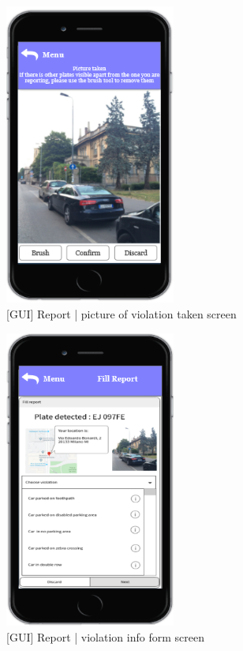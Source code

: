 \begin{figure}[H]
		\centering
      \includegraphics[width=0.5\textwidth]{GUI/pictaken.png}
      \caption{[GUI] Report | picture of violation taken screen}   \label{fig:pictaken}
\end{figure}


\begin{figure}[H]
		\centering
      \includegraphics[width=0.5\textwidth]{GUI/FillReport.png}
      \caption{[GUI] Report | violation info form screen}   \label{fig:FillReport}
\end{figure}

